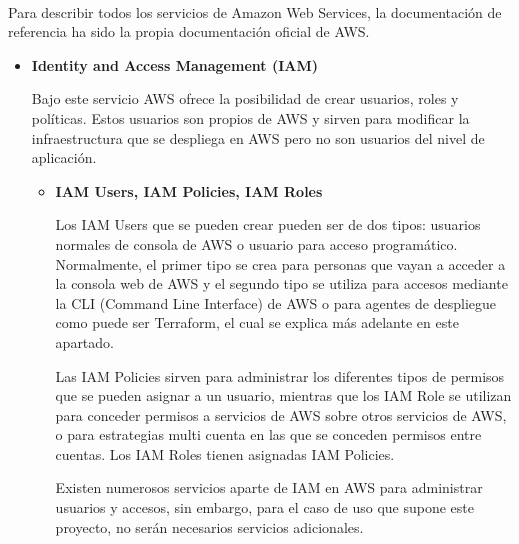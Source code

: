 \documentclass[../../memoria.tex]{subfiles}
\begin{document}
\paragraph{}
Para describir todos los servicios de Amazon Web Services, la documentación de referencia ha sido la propia documentación oficial de AWS. \cite{awsdoc}
\begin{itemize}
      \item \textbf{Identity and Access Management (IAM)}
            \par
            Bajo este servicio AWS ofrece la posibilidad de crear usuarios, roles y políticas. Estos usuarios son propios de AWS y sirven para modificar la infraestructura que se despliega en AWS pero no son usuarios del nivel de aplicación.
            \begin{itemize}
                  \item \textbf{IAM Users, IAM Policies, IAM Roles}
                        \par
                        Los IAM Users que se pueden crear pueden ser de dos tipos: usuarios normales de consola de AWS o usuario para acceso programático. Normalmente, el primer tipo se crea para personas que vayan a acceder a la consola web de AWS y el segundo tipo se utiliza para accesos mediante la CLI (Command Line Interface) de AWS o para agentes de despliegue como puede ser Terraform, el cual se explica más adelante en este apartado.
                        \par
                        Las IAM Policies sirven para administrar los diferentes tipos de permisos que se pueden asignar a un usuario, mientras que los IAM Role se utilizan para conceder permisos a servicios de AWS sobre otros servicios de AWS, o para estrategias multi cuenta en las que se conceden permisos entre cuentas. Los IAM Roles tienen asignadas IAM Policies.
                        \par
                        Existen numerosos servicios aparte de IAM en AWS para administrar usuarios y accesos, sin embargo, para el caso de uso que supone este proyecto, no serán necesarios servicios adicionales.
            \end{itemize}


\end{itemize}
\end{document}
